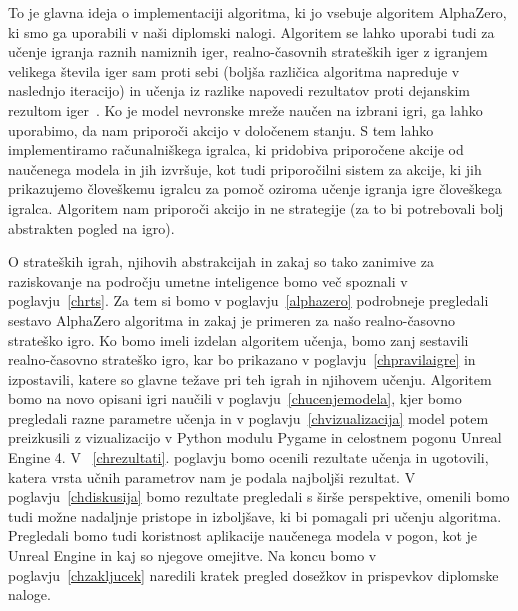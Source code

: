 \documentclass[a4paper, 12pt]{book}
\begin{document}
To je glavna ideja o implementaciji algoritma, ki jo vsebuje algoritem AlphaZero, ki smo ga uporabili v naši diplomski nalogi.
Algoritem se lahko uporabi tudi za učenje igranja raznih namiznih iger, realno-časovnih strateških iger z igranjem velikega števila iger sam proti sebi (boljša različica algoritma napreduje v naslednjo iteracijo) in učenja iz razlike napovedi rezultatov proti dejanskim rezultom iger~{\cite{silver2018general}}.
Ko je model nevronske mreže naučen na izbrani igri, ga lahko uporabimo, da nam priporoči akcijo v določenem stanju.
S tem lahko implementiramo računalniškega igralca, ki pridobiva priporočene akcije od naučenega modela in jih izvršuje, kot tudi priporočilni sistem za akcije, ki jih prikazujemo človeškemu igralcu za pomoč oziroma učenje igranja igre človeškega igralca. 
Algoritem nam priporoči akcijo in ne strategije (za to bi potrebovali bolj abstrakten pogled na igro). 

O strateških igrah, njihovih abstrakcijah in zakaj so tako zanimive za raziskovanje na področju umetne inteligence bomo več spoznali v poglavju~\ref{chrts}.
Za tem si bomo v poglavju~\ref{alphazero} podrobneje pregledali sestavo AlphaZero algoritma in zakaj je primeren za našo realno-časovno strateško igro.
Ko bomo imeli izdelan algoritem učenja, bomo zanj sestavili realno-časovno strateško igro, kar bo prikazano v poglavju~\ref{chpravilaigre} in izpostavili, katere so glavne težave pri teh igrah in njihovem učenju.
Algoritem bomo na novo opisani igri naučili v poglavju~\ref{chucenjemodela}, kjer bomo pregledali razne parametre učenja in v poglavju~\ref{chvizualizacija} model potem preizkusili z vizualizacijo v Python modulu Pygame in celostnem pogonu Unreal Engine 4.
V ~\ref{chrezultati}. poglavju bomo ocenili rezultate učenja in ugotovili, katera vrsta učnih parametrov nam je podala najboljši rezultat.
V poglavju~\ref{chdiskusija} bomo rezultate pregledali s širše perspektive, omenili bomo tudi možne nadaljnje pristope in izboljšave, ki bi pomagali pri učenju algoritma. 
Pregledali bomo tudi koristnost aplikacije naučenega modela v pogon, kot je Unreal Engine in kaj so njegove omejitve.
Na koncu bomo v poglavju~\ref{chzakljucek} naredili kratek pregled dosežkov in prispevkov diplomske naloge.

\end{document}
